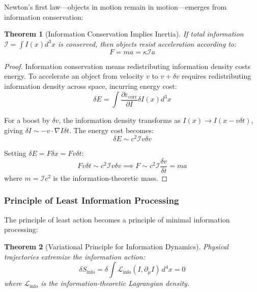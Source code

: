 \documentclass[12pt,a4paper]{article}
\newtheorem{theorem}{Theorem}[section]
\theoremstyle{remark}
\begin{document}
Newton's first law—objects in motion remain in motion—emerges from information conservation:

\begin{theorem}[Information Conservation Implies Inertia]
\label{thm:inertia}
If total information $\mathcal{I} = \int I(x)d^3x$ is conserved, then objects resist acceleration according to:
\begin{equation}
F = ma = \kappa \mathcal{I} a
\end{equation}
\end{theorem}

\begin{proof}
Information conservation means redistributing information density costs energy. To accelerate an object from velocity $v$ to $v + \delta v$ requires redistributing information density across space, incurring energy cost:
\begin{equation}
\delta E = \int \frac{\partial \varepsilon_{\text{corr}}}{\partial I} \delta I(x) d^3x
\end{equation}

For a boost by $\delta v$, the information density transforms as $I(x) \to I(x - v\delta t)$, giving $\delta I \sim -v \cdot \nabla I \delta t$. The energy cost becomes:
\begin{equation}
\delta E \sim c^2 \mathcal{I} v \delta v
\end{equation}

Setting $\delta E = F \delta x = F v \delta t$:
\begin{equation}
F v \delta t \sim c^2 \mathcal{I} v \delta v \implies F \sim c^2 \mathcal{I} \frac{\delta v}{\delta t} = ma
\end{equation}
where $m = \mathcal{I}c^2$ is the information-theoretic mass.
\end{proof}

\subsubsection{Principle of Least Information Processing}

The principle of least action becomes a principle of minimal information processing:

\begin{theorem}[Variational Principle for Information Dynamics]
Physical trajectories extremize the information action:
\begin{equation}
\delta S_{\text{info}} = \delta \int \mathcal{L}_{\text{info}}(I, \partial_\mu I) \, d^4x = 0
\end{equation}
where $\mathcal{L}_{\text{info}}$ is the information-theoretic Lagrangian density.
\end{theorem}
\end{document}
